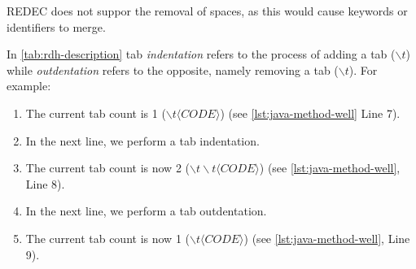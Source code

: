 \documentclass[%
class=scrreprt,
chapterprefix=false,%
open=right,%
twoside=false,%
paper=a4,%
logofile={Logo\_zentral\_farbig\_EN.png},%
thesistype=master,%
UKenglish,%
]{se2thesis}
\theoremstyle{definition}
\newcommand{\rdh}{REDEC\xspace}
\begin{document}
	
	\rdh does not suppor the removal of spaces, as this would cause keywords or identifiers to merge.
	
	In \autoref{tab:rdh-description} tab \textit{indentation} refers to the process of adding a tab ($\backslash t$) while \textit{outdentation} refers to the opposite, namely removing a tab ($\backslash t$). 
	For example:
	\begin{enumerate}
		\item The current tab count is 1 ($\backslash t \langle CODE \rangle$) (see \autoref{lst:java-method-well} Line 7).
		\item In the next line, we perform a tab indentation.
		\item The current tab count is now 2 ($\backslash t \backslash t \langle CODE \rangle $) (see \autoref{lst:java-method-well}, Line 8).
		\item In the next line, we perform a tab outdentation.
		\item The current tab count is now 1 ($\backslash t \langle CODE \rangle $) (see \autoref{lst:java-method-well}, Line 9).
	\end{enumerate}
	
\end{document}
